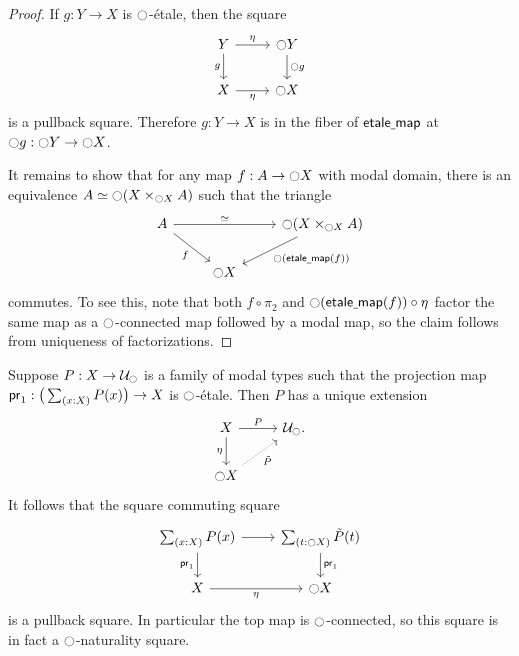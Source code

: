 \documentclass[9pt,twosided]{amsart}
\begin{document}
\begin{proof}
If $g:Y\to X$ is ${\ocircle}$-\'etale, then the square
\begin{equation*}
\begin{tikzcd}
Y \arrow[d,swap,"g"] \arrow[r,"\modalunit"] & \modal Y \arrow[d,"\modal g"] \\
X \arrow[r,swap,"\modalunit"] & \modal X
\end{tikzcd}
\end{equation*}
is a pullback square. Therefore $g:Y\to X$ is in the fiber of $\mathsf{etale\underline{\ }{}map}$ at ${\ocircle} g : {\ocircle} Y\to{\ensuremath{\ocircle}} X$. 

It remains to show that for any map $f:A\to{\ensuremath{\ocircle}} X$ with modal domain, there is an equivalence $\eqv{A}{\modal (X\times_{\modal X} A)}$ such that the triangle
\begin{equation*}
\begin{tikzcd}
A \arrow[dr,swap,"f"] \arrow[rr,"\eqvsym"] & & \modal (X\times_{\modal X} A) \arrow[dl,"\modal(\etmap(f))"] \\
& \modal X
\end{tikzcd}
\end{equation*}
commutes. To see this, note that both $f\circ \pi_2$ and ${\ocircle}(\mathsf{etale\underline{\ }{}map}(f))\circ {\eta_{}}$ factor the same map as a ${\ocircle}$-connected map followed by a modal map, so the claim follows from uniqueness of factorizations.
\end{proof}

\begin{cor}
Suppose $P:X\to\mathcal{U}_{\ocircle}$ is a family of modal types such that the projection map $\proj 1:\big(\sm{x:X}P(x)\big)\to X$ is ${\ocircle}$-\'etale. Then $P$ has a unique extension
\begin{equation*}
\begin{tikzcd}
X \arrow[d,swap,"\modalunit"] \arrow[r,"P"] & \UU_\modal. \\
\modal X \arrow[ur,densely dotted,swap,"\tilde{P}"] 
\end{tikzcd}
\end{equation*}
It follows that the square commuting square
\begin{equation*}
\begin{tikzcd}
\sm{x:X}P(x) \arrow[d,swap,"\proj 1"] \arrow[r] & \sm{t:\modal X}\tilde{P}(t) \arrow[d,"\proj 1"] \\
X \arrow[r,swap,"\modalunit"] & \modal X
\end{tikzcd}
\end{equation*}
is a pullback square. In particular the top map is ${\ocircle}$-connected, so this square is in fact a ${\ocircle}$-naturality square.
\end{cor}
\end{document}
